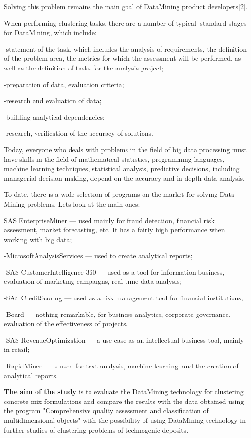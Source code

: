 Solving this problem remains the main goal of DataMining product
developers{[}2{]}.

When performing clustering tasks, there are a number of typical,
standard stages for DataMining, which include:

-statement of the task, which includes the analysis of requirements, the
definition of the problem area, the metrics for which the assessment
will be performed, as well as the definition of tasks for the analysis
project;

-preparation of data, evaluation criteria;

-research and evaluation of data;

-building analytical dependencies;

-research, verification of the accuracy of solutions.

Today, everyone who deals with problems in the field of big data
processing must have skills in the field of mathematical statistics,
programming languages, machine learning techniques, statistical
analysis, predictive decisions, including managerial decision-making,
depend on the accuracy and in-depth data analysis.

To date, there is a wide selection of programs on the market for solving
Data Mining problems. Let\textquotesingle s look at the main ones:

SAS EnterpriseMiner --- used mainly for fraud detection, financial risk
assessment, market forecasting, etc. It has a fairly high performance
when working with big data;

-MicrosoftAnalysisServices --- used to create analytical reports;

-SAS CustomerIntelligence 360 --- used as a tool for information
business, evaluation of marketing campaigns, real-time data analysis;

-SAS CreditScoring --- used as a risk management tool for financial
institutions;

-Board --- nothing remarkable, for business analytics, corporate
governance, evaluation of the effectiveness of projects.

-SAS RevenueOptimization --- a use case as an intellectual business
tool, mainly in retail;

-RapidMiner --- is used for text analysis, machine learning, and the
creation of analytical reports.

{\bfseries The aim of the study} is to evaluate the DataMining technology
for clustering concrete mix formulations and compare the results with
the data obtained using the program "Comprehensive quality assessment
and classification of multidimensional objects" with the possibility of
using DataMining technology in further studies of clustering problems of
technogenic deposits.

